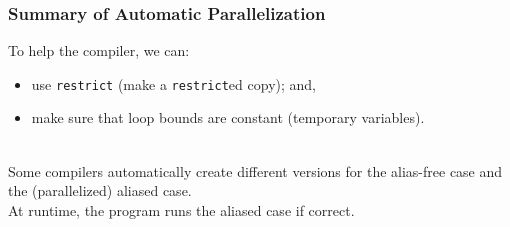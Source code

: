 \begin{frame}
  \frametitle{Summary of Automatic Parallelization}

  
To help the compiler, we can:
\begin{itemize}
\item use {\tt restrict} (make a {\tt restrict}ed copy); and,
\item make sure that loop bounds are constant (temporary
variables). 
\end{itemize}
~\\
Some compilers automatically create different versions
for the alias-free case and the (parallelized) aliased case.\\[1em]

At runtime, the program runs the aliased case if correct.

\end{frame}




